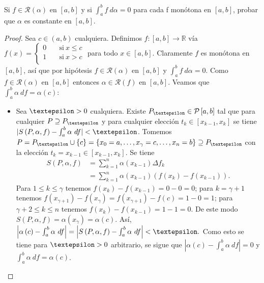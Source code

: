 \begin{exercise}
  Si $f\in \mathcal{R}\left(\alpha\right)$ en $\left[a,b\right]$ y si $\int_a^b f\ d\alpha=0$ para cada f monótona en $\left[a,b\right]$, probar que $\alpha$ es constante en $\left[a,b\right]$.
\end{exercise}

\begin{proof}
  Sea $c\in\left(a,b\right)$ cualquiera. Definimos $f:\left[a,b\right]\rightarrow\mathds{R}$ vía
  $f(x)=\begin{cases}
    0 \quad &\text{si}\ x \leq c \\
    1 \quad &\text{si}\ x >c \\
  \end{cases}$
  \quad para todo $x\in\left[a,b\right]$. Claramente $f$ es monótona en $\left[a,b\right]$, así que por hipótesis $f\in\mathcal{R}\left(\alpha\right)$ en $\left[a,b\right]$ y $\int_a^b f\ d\alpha=0$. Como $f\in\mathcal{R}\left(\alpha\right)$ en $\left[a,b\right]$ entonces $\alpha\in\mathcal{R}\left(f\right)$ en $\left[a,b\right]$. Veamos que $\int_a^b \alpha\ df = \alpha\left(c\right)$:
  \begin{itemize}
    \item[]Sea $\text{\textepsilon}>0$ cualquiera. Existe $P_{\text{\textepsilon}}\in \mathcal{P}\left[a,b\right] $ tal que para cualquier $P\supseteq P_{\text{\textepsilon}}$ y para cualquier elección $t_k\in\left[x_{k-1},x_k\right]$ se tiene $|S\left(P,\alpha,f\right)-\int_a^b\alpha\ df|<\text{\textepsilon}$. Tomemos $P=P_{\text{\textepsilon}}\cup\left\lbrace c \right\rbrace=\left\lbrace x_0=a,\dots,x_\gamma=c,\dots,x_n=b \right\rbrace\supseteq P_{\text{\textepsilon}}$ con la elección $t_k=x_{k-1}\in\left[x_{k-1},x_k\right]$. Se tiene
    \begin{align*}
      S\left(P,\alpha,f\right)&=\sum_{k=1}^{n}\alpha\left(x_{k-1}\right)\Delta f_k\\
      &=\sum_{k=1}^{n}\alpha\left(x_{k-1}\right)\left(f\left(x_k\right)-f\left(x_{k-1}\right)\right).
    \end{align*}
    Para $1\leq k\leq \gamma$ tenemos $f\left(x_k\right)-f\left(x_{k-1}\right)=0-0=0$; para $k=\gamma +1$ tenemos $f\left(x_{\gamma+1}\right)-f\left(x_{\gamma}\right)=f\left(x_{\gamma+1}\right)-f\left(c\right)=1-0=1$; para $\gamma+2\leq k\leq n$ tenemos $f\left(x_k\right)-f\left(x_{k-1}\right)=1-1=0$. De este modo $S\left(P,\alpha,f\right)=\alpha\left(x_\gamma\right)=\alpha\left(c\right)$. Así, $\left|\alpha\left(c\right)-\int_a^b \alpha\ df\right|= \left|S\left(P,\alpha,f\right)-\int_a^b \alpha\ df\right|<\text{\textepsilon}.$ Como esto se tiene para $\text{\textepsilon}>0$ arbitrario, se sigue que $\left|\alpha\left(c\right)-\int_a^b\alpha\ df\right|=0$ y $\int_a^b\alpha\ df=\alpha\left(c\right)$.

\end{itemize}
\end{proof}

